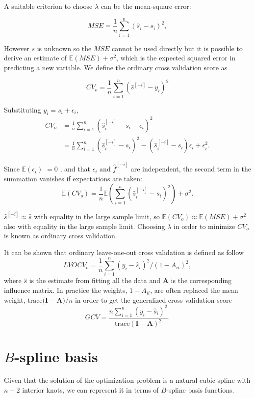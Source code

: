 \documentclass[]{book}
\begin{document}
A suitable criterion to choose \(\lambda\) can be the mean-square error:

\[MSE = \frac{1}{n}\sum_{i=1}^n(\hat{s}_i - s_i)^2,\]

However \(s\) is unknown so the \(MSE\) cannot be used directly but it is
possible to derive an estimate of \(\mathbb{E}(MSE) + \sigma^2\), which is
the expected squared error in predicting a new variable. We define the
ordinary cross validation score as

\[CV_o = \frac{1}{n}\sum_{i=1}^n(\hat{s}^{[-i]} - y_i)^2\]

Substituting \(y_i = s_i + \epsilon_i\), \[\begin{aligned}
CV_o &= \frac{1}{n}\sum_{i=1}^n(\hat{s}_i^{[-i]} - s_i - \epsilon_i)^2 \\
&= \frac{1}{n}\sum_{i=1}^n(\hat{s}_i^{[-i]} - s_i)^2 - (\hat{s}_i^{[-i]} - s_i)\epsilon_i + \epsilon_i^2.\end{aligned}\]

Since \(\mathbb{E}(\epsilon_i)\) \(= 0\) , and that \(\epsilon_i\) and
\(\hat{f}^{[-i]}\) are independent, the second term in the summation
vanishes if expectations are taken:
\[\mathbb{E}(CV_o) = \frac{1}{n}\mathbb{E}\left( \sum_{i=1}^n(\hat{s}_i^{[-i]} - s_i)^2\right) + \sigma^2.\]

\(\hat{s}^{[-i]} \approx \hat{s}\) with equality in the large sample
limit, so \(\mathbb{E}(CV_o) \approx \mathbb{E}(MSE) + \sigma^2\) also
with equality in the large sample limit. Choosing \(\lambda\) in order to
minimize \(CV_o\) is known as ordinary cross validation.

It can be shown that ordinary leave-one-out cross validation is defined
as follow
\[LVOCV_o = \frac{1}{n}\sum_{i=1}^{n}(y_i-\hat{s}_i)^2/(1-A_{ii})^2,\]
where \(\hat{s}\) is the estimate from fitting all the data and
\(\mathbf{A}\) is the corresponding influence matrix. In practice the
weights, \(1 - A_{ii}\), are often replaced the mean weight,
\(\text{trace}(\mathbf{I - A)}/n\) in order to get the generalized cross
validation score
\[GCV = \frac{n\sum_{i=1}^n(y_i-\hat{s}_i)^2}{\text{trace}(\mathbf{I-A})^2}.\]

\hypertarget{Bspline}{%
\chapter{\texorpdfstring{\(\mathit{B}\)-spline basis}{\textbackslash{}mathit\{B\}-spline basis}}\label{Bspline}}

Given that the solution of the optimization problem is a natural cubic
spline with \(n-2\) interior knots, we can represent it in terms of
\(\mathit{B}\)-spline basis functions.
\end{document}
